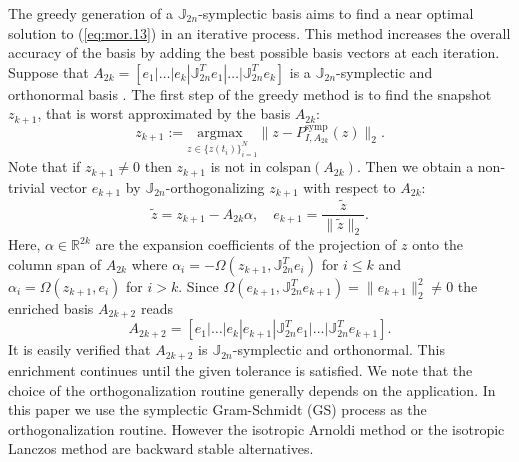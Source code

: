 The greedy generation of a $\mathbb J_{2n}$-symplectic basis aims to find a near optimal solution to (\ref{eq:mor.13}) in an iterative process. This method increases the overall accuracy of the basis by adding the best possible basis vectors at each iteration. Suppose that $A_{2k} = [e_1|\dots|e_k|\mathbb J_{2n}^T e_1|\dots|\mathbb J_{2n}^T e_k]$ is a $\mathbb J_{2n}$-symplectic and orthonormal basis \cite{doi:10.1137/17M1111991}. The first step of the greedy method is to find the snapshot $z_{k+1}$, that is worst approximated by the basis $A_{2k}$:
\begin{equation} \label{eq:mor.14}
	z_{k+1} := \underset{z \in \{ z(t_i) \}_{i=1}^N}{\text{argmax } }\| z - P^\text{symp}_{I,A_{2k}}(z) \|_2. 
\end{equation}
Note that if $z_{k+1}\neq 0$ then $z_{k+1}$ is not in colspan$(A_{2k})$. Then we obtain a non-trivial vector $e_{k+1}$ by $\mathbb J_{2n}$-orthogonalizing $z_{k+1}$ with respect to $A_{2k}$:
\begin{equation} \label{eq:mor.14.1}
	\tilde z = z_{k+1} - A_{2k}\alpha, \quad e_{k+1} = \frac{\tilde z}{\|\tilde z \|_2}.
\end{equation}
Here, $\alpha\in \mathbb R^{2k}$ are the expansion coefficients of the projection of $z$ onto the column span of $A_{2k}$ where $\alpha_i = -\Omega(z_{k+1},\mathbb J_{2n}^Te_i)$ for $i\leq k$ and $\alpha_i = \Omega(z_{k+1},e_i)$ for $i>k$. Since $\Omega(e_{k+1},\mathbb{J}_{2n}^T e_{k+1}) = \| e_{k+1} \|_2^2 \neq 0$ the enriched basis $A_{2k+2}$ reads
\begin{equation} \label{eq:mor.15}
	A_{2k+2} = [e_1|\dots|e_k|e_{k+1}|\mathbb J_{2n}^Te_1|\dots|\mathbb J_{2n}^Te_{k+1}].	
\end{equation}
It is easily verified that $A_{2k+2}$ is $\mathbb J_{2n}$-symplectic and orthonormal. This enrichment continues until the given tolerance is satisfied. We note that the choice of the orthogonalization routine generally depends on the application. In this paper we use the symplectic Gram-Schmidt (GS) process as the orthogonalization routine. However the isotropic Arnoldi method or the isotropic Lanczos method \cite{doi:10.1137/S1064827500366434} are backward stable alternatives.

